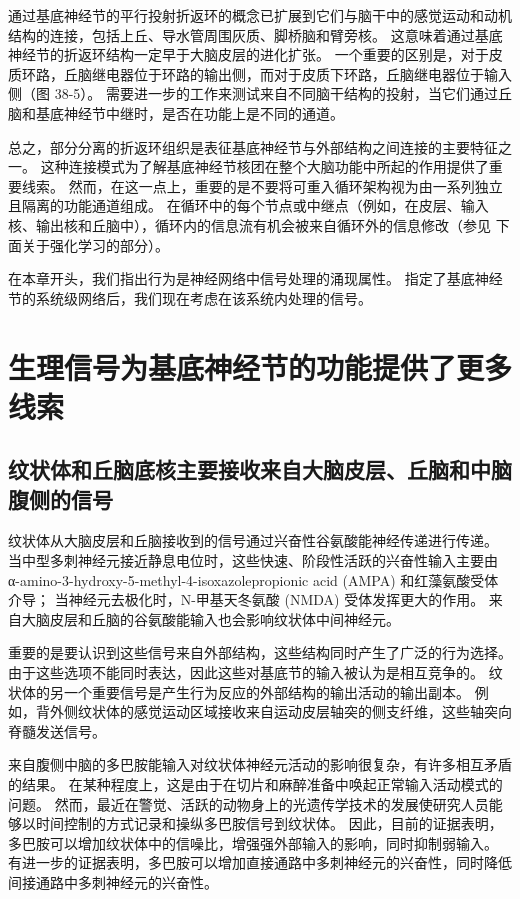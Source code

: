 通过基底神经节的平行投射折返环的概念已扩展到它们与脑干中的感觉运动和动机结构的连接，包括上丘、导水管周围灰质、脚桥脑和臂旁核。 这意味着通过基底神经节的折返环结构一定早于大脑皮层的进化扩张。 一个重要的区别是，对于皮质环路，丘脑继电器位于环路的输出侧，而对于皮质下环路，丘脑继电器位于输入侧（图 38-5）。 需要进一步的工作来测试来自不同脑干结构的投射，当它们通过丘脑和基底神经节中继时，是否在功能上是不同的通道。

总之，部分分离的折返环组织是表征基底神经节与外部结构之间连接的主要特征之一。 这种连接模式为了解基底神经节核团在整个大脑功能中所起的作用提供了重要线索。 然而，在这一点上，重要的是不要将可重入循环架构视为由一系列独立且隔离的功能通道组成。 在循环中的每个节点或中继点（例如，在皮层、输入核、输出核和丘脑中），循环内的信息流有机会被来自循环外的信息修改（参见 下面关于强化学习的部分）。

在本章开头，我们指出行为是神经网络中信号处理的涌现属性。 指定了基底神经节的系统级网络后，我们现在考虑在该系统内处理的信号。


\section{生理信号为基底神经节的功能提供了更多线索}
\subsection{纹状体和丘脑底核主要接收来自大脑皮层、丘脑和中脑腹侧的信号}
纹状体从大脑皮层和丘脑接收到的信号通过兴奋性谷氨酸能神经传递进行传递。 当中型多刺神经元接近静息电位时，这些快速、阶段性活跃的兴奋性输入主要由 α-amino-3-hydroxy-5-methyl-4-isoxazolepropionic acid (AMPA) 和红藻氨酸受体介导； 当神经元去极化时，N-甲基天冬氨酸 (NMDA) 受体发挥更大的作用。 来自大脑皮层和丘脑的谷氨酸能输入也会影响纹状体中间神经元。

重要的是要认识到这些信号来自外部结构，这些结构同时产生了广泛的行为选择。 由于这些选项不能同时表达，因此这些对基底节的输入被认为是相互竞争的。 纹状体的另一个重要信号是产生行为反应的外部结构的输出活动的输出副本。 例如，背外侧纹状体的感觉运动区域接收来自运动皮层轴突的侧支纤维，这些轴突向脊髓发送信号。

来自腹侧中脑的多巴胺能输入对纹状体神经元活动的影响很复杂，有许多相互矛盾的结果。 在某种程度上，这是由于在切片和麻醉准备中唤起正常输入活动模式的问题。 然而，最近在警觉、活跃的动物身上的光遗传学技术的发展使研究人员能够以时间控制的方式记录和操纵多巴胺信号到纹状体。 因此，目前的证据表明，多巴胺可以增加纹状体中的信噪比，增强强外部输入的影响，同时抑制弱输入。 有进一步的证据表明，多巴胺可以增加直接通路中多刺神经元的兴奋性，同时降低间接通路中多刺神经元的兴奋性。

